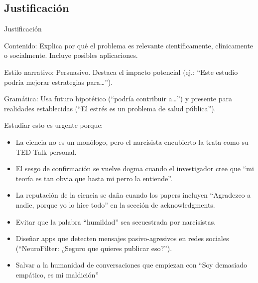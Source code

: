 \documentclass[
  10pt]{article}
\providecommand{\tightlist}{%
  \setlength{\itemsep}{0pt}\setlength{\parskip}{0pt}}\usepackage{longtable,booktabs,array}
\begin{document}
\subsection{Justificación}\label{justificaciuxf3n}

\begin{tcolorbox}[enhanced jigsaw, colframe=quarto-callout-tip-color-frame, toprule=.15mm, opacitybacktitle=0.6, arc=.35mm, coltitle=black, title=\textcolor{quarto-callout-tip-color}{\faLightbulb}\hspace{0.5em}{Tip}, breakable, rightrule=.15mm, bottomtitle=1mm, titlerule=0mm, leftrule=.75mm, opacityback=0, colbacktitle=quarto-callout-tip-color!10!white, colback=white, left=2mm, bottomrule=.15mm, toptitle=1mm]

Justificación

Contenido: Explica por qué el problema es relevante científicamente,
clínicamente o socialmente. Incluye posibles aplicaciones.

Estilo narrativo: Persuasivo. Destaca el impacto potencial (ej.: ``Este
estudio podría mejorar estrategias para\ldots{}'').

Gramática: Usa futuro hipotético (``podría contribuir a\ldots{}'') y
presente para realidades establecidas (``El estrés es un problema de
salud pública'').

\end{tcolorbox}

Estudiar esto es urgente porque:

\begin{itemize}
\tightlist
\item
  La ciencia no es un monólogo, pero el narcisista encubierto la trata
  como su TED Talk personal.
\item
  El sesgo de confirmación se vuelve dogma cuando el investigador cree
  que ``mi teoría es tan obvia que hasta mi perro la entiende''.
\item
  La reputación de la ciencia se daña cuando los papers incluyen
  ``Agradezco a nadie, porque yo lo hice todo'' en la sección de
  acknowledgments.
\item
  Evitar que la palabra ``humildad'' sea secuestrada por narcisistas.
\item
  Diseñar apps que detecten mensajes pasivo-agresivos en redes sociales
  (``NeuroFilter: ¿Seguro que quieres publicar eso?'').
\item
  Salvar a la humanidad de conversaciones que empiezan con ``Soy
  demasiado empático, es mi maldición''
\end{itemize}
\end{document}
